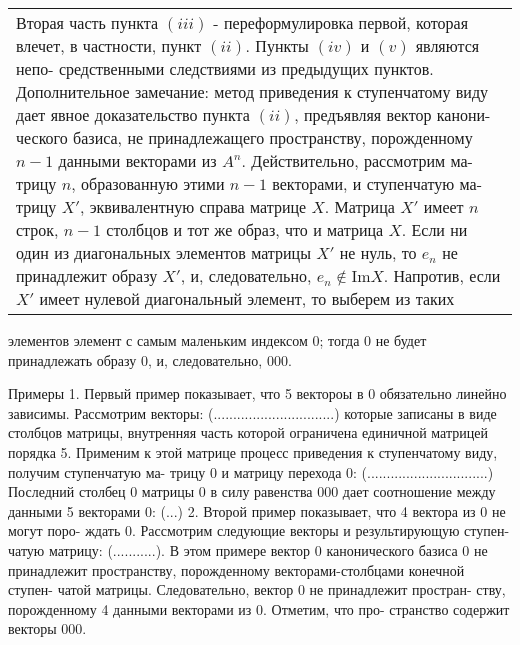 \documentclass{mai_book}
\begin{document}
\begin{tabular}{|p{13cm}}
	Вторая часть пункта $(iii)$ - переформулировка первой, которая\linebreak
	влечет, в частности, пункт $(ii)$. Пункты $(iv)$ и $(v)$ являются непо-\linebreak
	средственными следствиями из предыдущих пунктов.\linebreak
	Дополнительное замечание: метод приведения к ступенчатому виду\linebreak
	дает явное доказательство пункта $(ii)$, предъявляя вектор канони-\linebreak
	ческого базиса, не принадлежащего пространству, порожденному\linebreak
	$n - 1$ данными векторами из $A^n$. Действительно, рассмотрим ма-\linebreak
	трицу $n$, образованную этими $n - 1$ векторами, и ступенчатую ма-\linebreak
	трицу $X'$, эквивалентную справа матрице $X$. Матрица $X'$ имеет\linebreak
	$n$ строк, $n - 1$ столбцов и тот же образ, что и матрица $X$. Если\linebreak
	ни один из диагональных элементов матрицы $X'$ не нуль, то $e_n$ не\linebreak
	принадлежит образу $X'$, и, следовательно, $e_n \notin$Im$X$. Напротив,\linebreak
	если $X'$ имеет нулевой диагональный элемент, то выберем из таких
	\end{tabular}
	
	\pagebreak
	
	элементов элемент с самым маленьким индексом 0; тогда 0 не будет\linebreak
	принадлежать образу 0, и, следовательно, 000.
	
	Примеры
	1. Первый пример показывает, что 5 вектороы в 0 обязательно\linebreak
	линейно зависимы. Рассмотрим векторы:
	(...............................)
	которые записаны в виде столбцов матрицы, внутренняя часть которой\linebreak
	ограничена единичной матрицей порядка 5. Применим к этой матрице\linebreak
	процесс приведения к ступенчатому виду, получим ступенчатую ма-\linebreak
	трицу 0 и матрицу перехода 0:
	(...............................)
	Последний столбец 0 матрицы 0 в силу равенства 000 дает\linebreak
	соотношение между данными 5 векторами 0:
	(...)
	2. Второй пример показывает, что 4 вектора из 0 не могут поро-\linebreak
	ждать 0. Рассмотрим следующие векторы и результирующую ступен-\linebreak
	чатую матрицу:
	(...........).
	В этом примере вектор 0 канонического базиса 0 не принадлежит\linebreak
	пространству, порожденному векторами-столбцами конечной ступен-\linebreak
	чатой матрицы. Следовательно, вектор 0 не принадлежит простран-\linebreak
	ству, порожденному 4 данными векторами из 0. Отметим, что про-\linebreak
	странство содержит векторы 000.
	
	\pagebreak
	
	
\end{document}
